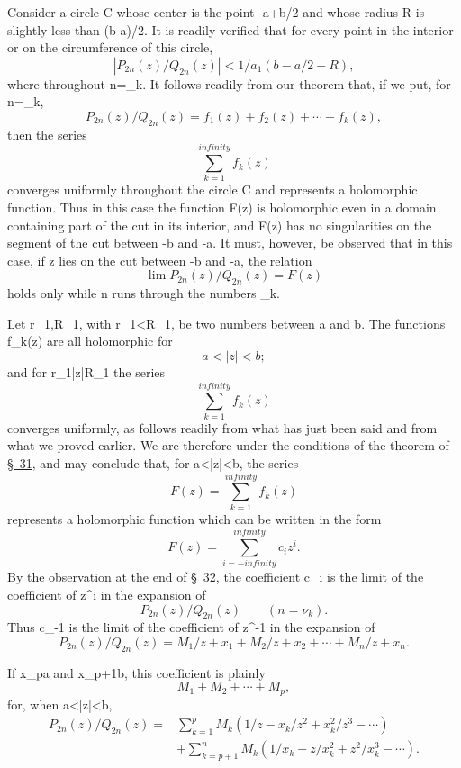 \documentclass[
  paper=b5,
  fontsize=13pt,
  twoside,
  headings=normal,
  bookmarkpackage=false
]{scrartcl}
\theoremstyle{stieltjesplain}
\theoremstyle{stieltjesdefinition}
\def\({}\def\){}%
\def\frac#1#2{#1/#2}%
\def\infty{infinity}%
\begin{document}
Consider a circle \(C\) whose center is the point
\(-\frac{a+b}{2}\) and whose radius \(R\) is slightly less than
\((b-a)/2\). It is readily verified that for every point in the interior
or on the circumference of this circle,
\[
 \left|\frac{P_{2n}(z)}{Q_{2n}(z)}\right|
 <\frac1{a_1\left(\frac{b-a}{2}-R\right)},
\]
where throughout \(n=\nu_k\). It follows readily from our theorem that,
if we put, for \(n=\nu_k\),
\[
 \frac{P_{2n}(z)}{Q_{2n}(z)}
  =f_1(z)+f_2(z)+\cdots+f_k(z),
\]
then the series
\[
 \sum_{k=1}^{\infty}f_k(z)
\]
converges uniformly throughout the circle \(C\) and represents a
holomorphic function. Thus in this case the function \(F(z)\) is
holomorphic even
in a domain containing part of the cut in its interior, and \(F(z)\) has
no singularities on the segment of the cut between \(-b\) and \(-a\).
It must, however, be observed that in this case, if \(z\) lies on the cut
between \(-b\) and \(-a\), the relation
\[
 \lim\frac{P_{2n}(z)}{Q_{2n}(z)}=F(z)
\]
holds only while \(n\) runs through the numbers \(\nu_k\).

Let \(r_1,R_1\), with \(r_1<R_1\), be two numbers between \(a\) and
\(b\). The functions \(f_k(z)\) are all holomorphic for
\[
 a<|z|<b;
\]
and for \(r_1\leq|z|\leq R_1\) the series
\[
 \sum_{k=1}^{\infty}f_k(z)
\]
converges uniformly, as follows readily from what has just been said and
from what we proved earlier. We are therefore under the conditions of the
theorem of \hyperref[sec:31]{\S~31}, and may conclude that, for
\(a<|z|<b\), the series
\[
 F(z)=\sum_{k=1}^{\infty}f_k(z)
\]
represents a holomorphic function which can be written in the form
\[
 F(z)=\sum_{i=-\infty}^{\infty}c_iz^i.
\]
By the observation at the end of \hyperref[sec:32]{\S~32}, the
coefficient \(c_i\) is the limit of the coefficient of \(z^i\) in the
expansion of
\[
 \frac{P_{2n}(z)}{Q_{2n}(z)}\qquad(n=\nu_k).
\]
Thus \(c_{-1}\) is the limit of the coefficient of \(z^{-1}\) in the
expansion of
\[
 \frac{P_{2n}(z)}{Q_{2n}(z)}
  =\frac{M_1}{z+x_1}+\frac{M_2}{z+x_2}+\cdots+\frac{M_n}{z+x_n}.
\]

If \(x_p\leq a\) and \(x_{p+1}\geq b\), this coefficient is plainly
\[
 M_1+M_2+\cdots+M_p,
\]
for, when \(a<|z|<b\),
\begin{align*}
 \frac{P_{2n}(z)}{Q_{2n}(z)}
 ={}&\sum_{k=1}^{p}M_k
  \left(\frac1z-\frac{x_k}{z^2}+\frac{x_k^2}{z^3}-\cdots\right)\\
 &+\sum_{k=p+1}^{n}M_k
  \left(\frac1{x_k}-\frac z{x_k^2}+\frac{z^2}{x_k^3}-\cdots\right).
\end{align*}
\end{document}
